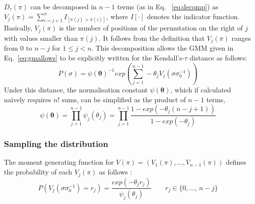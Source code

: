 \documentclass[conference]{IEEEtran}
\begin{document}
$D_{\tau}(\pi)$ can be decomposed in $n-1$ terms (as in Eq. ~\ref{eq:decomp}) as $V_{j}(\pi)=\sum_{i=j+1}^{n} I_{[\pi(j)>\pi(i)]}$, where $I[\cdot]$ denotes the indicator function. Basically, $V_j(\pi)$ is the number of positions of the permutation on the right of $j$ with values smaller than $\pi(j)$. It follows from the definition that $V_j(\pi)$ ranges from $0$ to $n-j$ for  $1\leq j< n$. This decomposition allows the GMM given in Eq.~\ref{eq:gmallows} to be explicitly written for the Kendall's-$\tau$ distance as follows:
\begin{equation} 
P(\sigma)= \psi(\boldsymbol{\theta})^{-1} exp(\sum_{j=1}^{n-1}-\theta_j V_j(\sigma \sigma_0^{-1}))
\label{eq:mallowsV}
\end{equation}
Under this distance, the normalisation constant $\psi(\boldsymbol\theta)$, which if calculated naively requires $n!$ sums, can be simplified as the product of $n-1$ terms, 
\begin{equation}
\psi(\boldsymbol{\theta})=\prod_{j=1}^{n-1} \psi_j(\theta_j) = \prod_{j=1}^{n-1} \frac{1-exp(-\theta_j (n-j+1))}{1-exp(-\theta_j)}
\label{eq:psij}
\end{equation}


\subsubsection{Sampling the distribution}
The moment generating function for $V(\pi) = (V_1(\pi), \ldots , V_{n-1}(\pi))$ defines the probability of each $V_j(\pi)$ as follows \cite{gMallows}: 
\begin{equation}
P(V_j(\sigma \sigma_0^{-1})=r_j)=\frac{exp(-\theta_jr_j )}{\psi_j(\theta_j)}   \quad \quad r_j\in \{0, ..., \,n-j \}
\label{eq:vjdistri}
\end{equation}
\end{document}
